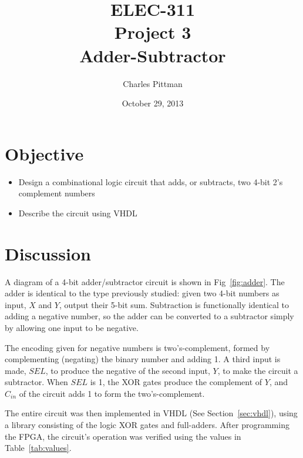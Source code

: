 \documentclass{article}
\author{Charles Pittman}
\title{ELEC-311\\ Project 3\\ Adder-Subtractor}
\date{October 29, 2013}
\begin{document}
\maketitle %

\pagebreak


\section{Objective}
\label{sec:objective}

\begin{itemize}
\item Design a combinational logic circuit that adds, or subtracts, two 4-bit 2's complement numbers
\item Describe the circuit using VHDL
\end{itemize}

\section{Discussion}
\label{sec:procedure}

A diagram of a 4-bit adder/subtractor circuit is shown in Fig~\ref{fig:adder}.  The adder is identical to the type previously studied: given two 4-bit numbers as input, $X$ and $Y$,  output their 5-bit sum.  Subtraction is functionally identical to adding a negative number, so the adder can be converted to a subtractor simply by allowing one input to be negative.

The encoding given for negative numbers is two's-complement, formed by complementing (negating) the binary number and adding 1.  A third input is made, $SEL$, to produce the negative of the second input, $Y$, to make the circuit a subtractor.  When $SEL$ is 1, the XOR gates produce the complement of $Y$, and $C_{in}$ of the circuit adds 1 to form the two's-complement.

The entire circuit was then implemented in VHDL (See Section~\ref{sec:vhdl}), using a library consisting of the logic XOR gates and full-adders.  After programming the FPGA, the circuit's operation was verified using the values in Table~\ref{tab:values}.
\end{document}
